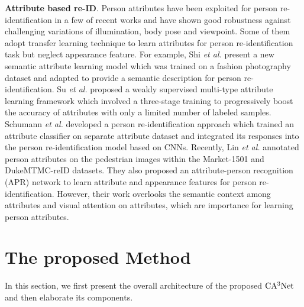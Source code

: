 \documentclass[sigconf]{acmart}
\begin{document}
\textbf{Attribute based re-ID}. Person attributes have been exploited for person re-identification in a few of recent works and have shown good robustness against challenging variations of illumination, body pose and viewpoint. Some of them adopt transfer learning technique to learn attributes for person re-identification task but neglect appearance feature. For example, Shi \textit{et al.}\cite{9} present a new semantic attribute learning model which was trained on a fashion photography dataset and adapted to provide a semantic description for person re-identification. Su \textit{et al.}\cite{10} proposed a weakly supervised multi-type attribute learning framework which involved a three-stage training to progressively boost the accuracy of attributes with only a limited number of labeled samples. Schumann \textit{et al.}\cite{11} developed a person re-identification approach which trained an attribute classifier on separate attribute dataset and integrated its responses into the person re-identification model based on CNNs. Recently, Lin \textit{et al.}\cite{12} annotated person attributes on the pedestrian images within the Market-1501 and DukeMTMC-reID datasets. They also proposed an attribute-person recognition (APR) network to learn attribute and appearance features for person re-identification. However, their work overlooks the semantic context among attributes and visual attention on attributes, which are importance for learning person attributes.
\section{The proposed Method}
In this section, we first present the overall architecture of the proposed $\rm CA^3Net$ and then elaborate its components.
\end{document}

